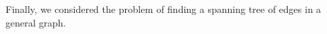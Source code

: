Finally, we considered the problem of finding a spanning tree of edges in a
general graph. 



\exercises










